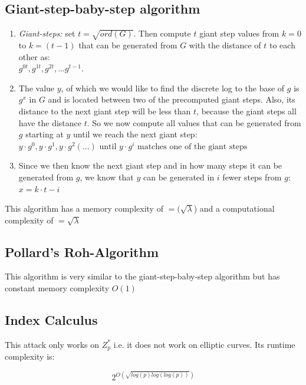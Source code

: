 \subsection{Giant-step-baby-step algorithm}\label{sec:giant_baby}

\begin{enumerate}
    \item \textit{Giant-steps:} set $t = \sqrt{ord(G)}$. Then compute $t$ giant step values from $k=0$ to $k=(t-1)$ that can be generated from $G$ with the distance of $t$ to each other as:\\
          $g^{0t}, g^{1t}, g^{2t}, ... g^{t-1}$.
    \item The value $y$, of which we would like to find the discrete log to the base of $g$ is $g^x$ in $G$ and is located between two of the precomputed giant steps. Also, its distance to the next giant step will be less than $t$, because the giant steps all have the distance $t$. So we now compute all values that can be generated from $g$ starting at $y$ until we reach the next giant step:\\
          $y \cdot g^0, y \cdot g^1, y \cdot g^2 (...) \text{ until $y \cdot g^i$ matches one of the giant steps}$
    \item Since we then know the next giant step and in how many steps it can be generated from $g$, we know that $y$ can be generated in $i$ fewer steps from $g$:\\
          $x = k \cdot t - i$
\end{enumerate}

This algorithm has a memory complexity of $=(\sqrt{\lambda}$) and a computational complexity of $=\sqrt{\lambda}$

\subsection{Pollard's Roh-Algorithm}\label{pollards_roh}

This algorithm is very similar to the giant-step-baby-step algorithm but has constant memory complexity $O(1)$

\subsection{Index Calculus}\label{sec:index_caclulus}

This attack only works on $Z_p^*$ i.e. it does not work on elliptic curves.
Its runtime complexity is:

$$
    2^{O(\sqrt{log(p)log(log(p))})}
$$

